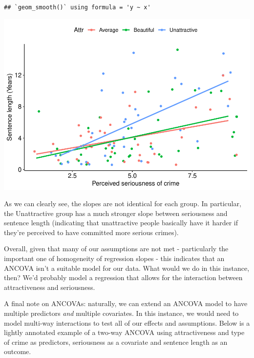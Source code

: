 \documentclass[
]{book}
\newenvironment{Shaded}{\begin{snugshade}}{\end{snugshade}}
\newcommand{\AttributeTok}[1]{\textcolor[rgb]{0.13,0.29,0.53}{#1}}
\newcommand{\CommentTok}[1]{\textcolor[rgb]{0.56,0.35,0.01}{\textit{#1}}}
\newcommand{\FunctionTok}[1]{\textcolor[rgb]{0.13,0.29,0.53}{\textbf{#1}}}
\newcommand{\NormalTok}[1]{#1}
\newcommand{\OtherTok}[1]{\textcolor[rgb]{0.56,0.35,0.01}{#1}}
\newcommand{\SpecialCharTok}[1]{\textcolor[rgb]{0.81,0.36,0.00}{\textbf{#1}}}
\begin{document}
\begin{verbatim}
## `geom_smooth()` using formula = 'y ~ x'
\end{verbatim}

\begin{center}\includegraphics{_main_files/figure-latex/unnamed-chunk-285-1} \end{center}

As we can clearly see, the slopes are not identical for each group. In particular, the Unattractive group has a much stronger slope between seriousness and sentence length (indicating that unattractive people basically have it harder if they're perceived to have committed more serious crimes).

Overall, given that many of our assumptions are not met - particularly the important one of homogeneity of regression slopes - this indicates that an ANCOVA isn't a suitable model for our data. What would we do in this instance, then? We'd probably model a regression that allows for the interaction between attractiveness and seriousness.

A final note on ANCOVAs: naturally, we can extend an ANCOVA model to have multiple predictors \emph{and} multiple covariates. In this instance, we would need to model multi-way interactions to test all of our effects and assumptions. Below is a lightly annotated example of a two-way ANCOVA using attractiveness and type of crime as predictors, seriousness as a covariate and sentence length as an outcome.

\begin{Shaded}
\end{Shaded}
\end{document}
